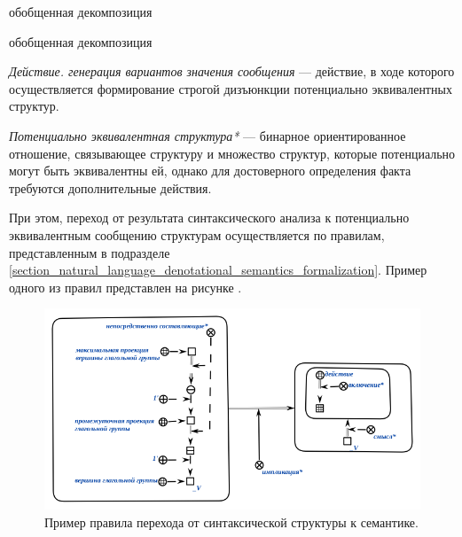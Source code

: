 {\begin{SCn}
    \begin{scnrelfromset}{обобщенная декомпозиция}
        \begin{scnindent}
            \begin{scnrelfromset}{обобщенная декомпозиция}
            \end{scnrelfromset}
        \end{scnindent}
    \end{scnrelfromset}

\end{SCn}

\textit{Действие. генерация вариантов значения сообщения} --- действие, в ходе которого осуществляется формирование строгой дизъюнкции потенциально эквивалентных структур.

\textit{Потенциально эквивалентная структура*} --- бинарное ориентированное отношение, связывающее структуру и множество структур, которые потенциально могут быть эквивалентны ей, однако для достоверного определения факта требуются дополнительные действия.

При этом, переход от результата синтаксического анализа к потенциально эквивалентным сообщению структурам осуществляется по правилам, представленным в подразделе \ref{section_natural_language_denotational_semantics_formalization}.
Пример одного из правил представлен на рисунке \textit{}.

\begin{figure}[h]
    \centering
    \includegraphics[scale=0.8]{images/part4/chapter_nl_interfaces/d_sem_3}
    \caption{Пример правила перехода от синтаксической структуры к семантике.}
    \label{fig:transition_to_semanic_rule}
\end{figure}

}
